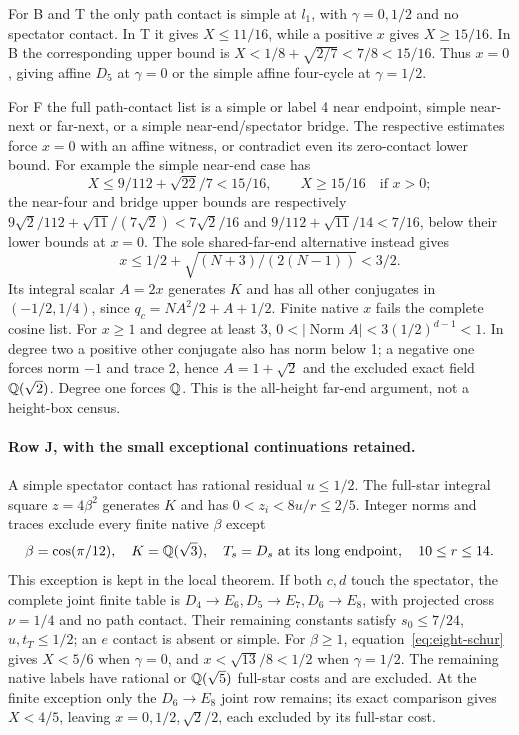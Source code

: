 For B and T the only path contact is simple at $l_1$, with
$\gamma=0,1/2$ and no spectator contact. In T it gives
$X\le11/16$, while a positive $x$ gives $X\ge15/16$.
In B the corresponding upper bound is
$X<1/8+\sqrt{2/7}<7/8<15/16$. Thus $x=0$, giving affine
$D_5$ at $\gamma=0$ or the simple affine four-cycle at $\gamma=1/2$.

For F the full path-contact list is a simple or label 4 near endpoint,
simple near-next or far-next, or a simple near-end/spectator bridge.
The respective estimates force $x=0$ with an affine witness, or
contradict even its zero-contact lower bound. For example the
simple near-end case has
\[
 X\le9/112+\sqrt{22}/7<15/16,
 \qquad X\ge15/16\quad\text{if }x>0;
\]
the near-four and bridge upper bounds are respectively
$9\sqrt2/112+\sqrt{11}/(7\sqrt2)<7\sqrt2/16$ and
$9/112+\sqrt{11}/14<7/16$, below their lower bounds at $x=0$.
The sole shared-far-end alternative instead gives
\[
 x\le1/2+\sqrt{(N+3)/(2(N-1))}<3/2.
\]
Its integral scalar $A=2x$ generates $K$ and has all other
conjugates in $(-1/2,1/4)$, since
$q_c=NA^2/2+A+1/2$. Finite native $x$ fails the complete
cosine list. For $x\ge1$ and degree at least 3,
$0<|\operatorname{Norm}A|<3(1/2)^{d-1}<1$.
In degree two a positive other conjugate also has norm below 1;
a negative one forces norm $-1$ and trace 2, hence
$A=1+\sqrt2$ and the excluded exact field $\mathbb Q(\sqrt2)$.
Degree one forces $\mathbb Q$. This is the all-height far-end argument,
not a height-box census.

\paragraph{Row J, with the small exceptional continuations retained.}
A simple spectator contact has rational residual $u\le1/2$.
The full-star integral square $z=4\beta^2$ generates $K$ and
has $0<z_i<8u/r\le2/5$. Integer norms and traces exclude every
finite native $\beta$ except
\[
 \beta=\cos(\pi/12),\quad K=\mathbb Q(\sqrt3),\quad
 T_s=D_s\text{ at its long endpoint},\quad 10\le r\le14.
\]
This exception is kept in the local theorem. If both $c,d$ touch
the spectator, the complete joint finite table is
$D_4\to E_6,D_5\to E_7,D_6\to E_8$, with projected cross
$\nu=1/4$ and no path contact. Their remaining constants satisfy
$s_0\le7/24$, $u,t_T\le1/2$; an $e$ contact is absent or simple.
For $\beta\ge1$, equation~\eqref{eq:eight-schur} gives
$X<5/6$ when $\gamma=0$, and $x<\sqrt{13}/8<1/2$ when
$\gamma=1/2$. The remaining native labels have rational or
$\mathbb Q(\sqrt5)$ full-star costs and are excluded. At the finite
exception only the $D_6\to E_8$ joint row remains; its exact
comparison gives $X<4/5$, leaving $x=0,1/2,\sqrt2/2$, each
excluded by its full-star cost.

